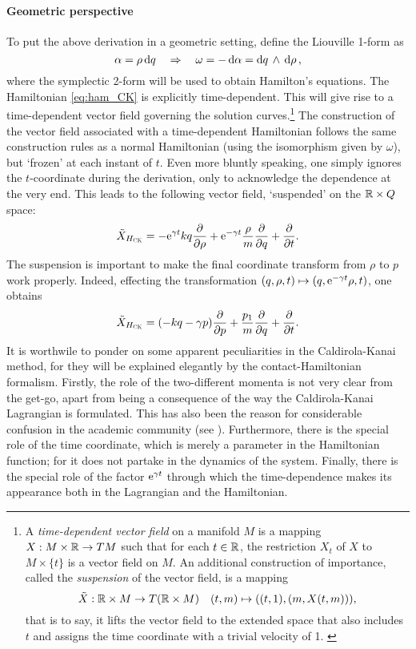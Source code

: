 \paragraph{Geometric perspective}
To put the above derivation in a geometric setting, define the Liouville 1-form as
$$ \alpha = \rho\dd{q} \quad \Rightarrow \quad \omega = -\dd{\alpha} =  \dd{q}\,\wedge\,\dd{\ensuremath{\rho}} ,$$
where the symplectic 2-form will be used to obtain Hamilton's equations. The Hamiltonian \cref{eq:ham_CK} is explicitly time-dependent. This will give rise to a time-dependent vector field governing the solution curves.\footnote
{A \emph{time-dependent vector field} on a manifold $M$ is a mapping $X: M\times\mathbb{R} \to TM$ such that for each $t \in \mathbb{R}$, the restriction $X_t$ of $X$ to $M \times \{t\}$ is a vector field on $M$. \cite{Libermann1987} An additional construction of importance, called the \emph{suspension} of the vector field, is a mapping $$ \tilde{X}: \mathbb{R} \times M \to T(\mathbb{R} \times M) \quad (t, m) \mapsto ((t, 1), (m, X(t, m))),$$ that is to say, it lifts the vector field to the extended space that also includes $t$ and assigns the time coordinate with a trivial velocity of 1. \cite{Abraham1978}}
The construction of the vector field associated with a time-dependent Hamiltonian follows the same construction rules as a normal Hamiltonian (using the isomorphism given by $\omega$), but `frozen' at each instant of $t$. Even more bluntly speaking, one simply ignores the $t$-coordinate during the derivation, only to acknowledge the dependence at the very end. This leads to the following vector field, `suspended' on the $\mathbb{R}\times Q$ space:
$$ \tilde{X}_{H_\text{\tiny{\textsc{CK}}}} = -\mathrm{e}^{\gamma t}kq\pdv{}{\ensuremath{\rho}} + \mathrm{e}^{-\gamma t}\frac{\rho}{m}\pdv{}{q} + \pdv{}{t}.$$
The suspension is important to make the final coordinate transform from $\rho$ to $p$ work properly. Indeed, effecting the transformation $(q, \rho, t) \mapsto (q, \mathrm{e}^{-\gamma t}\rho, t)$, one obtains
$$ \tilde{X}_{H_\text{\tiny{\textsc{CK}}}} = \qty(-kq - \gamma p)\pdv{}{p} + \frac{p_1}{m}\pdv{}{q} + \pdv{}{t}.$$
It is worthwile to ponder on some apparent peculiarities in the Caldirola-Kanai method, for they will be explained elegantly by the contact-Hamiltonian formalism. Firstly, the role of the two-different momenta is not very clear from the get-go, apart from being a consequence of the way the Caldirola-Kanai Lagrangian is formulated. This has also been the reason for considerable confusion in the academic community (see \citet{Schuch1997}). Furthermore, there is the special role of the time coordinate, which is merely a parameter in the Hamiltonian function; for it does not partake in the dynamics of the system. Finally, there is the special role of the factor $\mathrm{e}^{\gamma t}$ through which the time-dependence makes its appearance both in the Lagrangian and the Hamiltonian.

